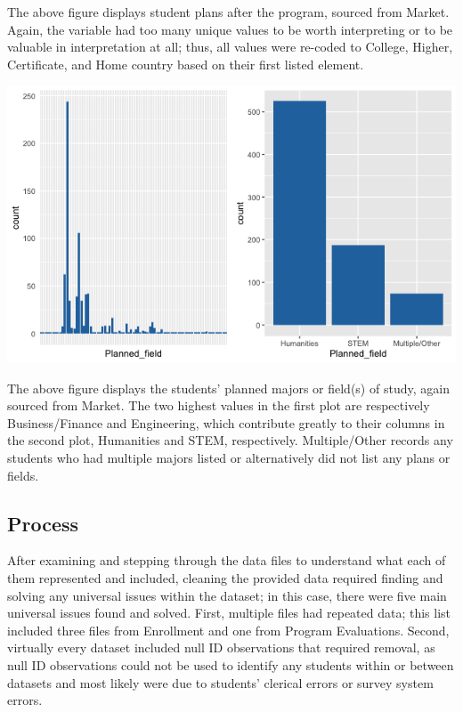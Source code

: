 \documentclass[12pt,letterpaper]{article}
\begin{document}
The above figure displays student plans after the program, sourced from Market. Again, the variable had too many unique values to be worth interpreting or to be valuable in interpretation at all; thus, all values were re-coded to College, Higher, Certificate, and Home country based on their first listed element.

\begin{center}
    \includegraphics[scale = 0.5]{Plots/schematic3.png}
\end{center}

The above figure displays the students' planned majors or field(s) of study, again sourced from Market. The two highest values in the first plot are respectively Business/Finance and Engineering, which contribute greatly to their columns in the second plot, Humanities and STEM, respectively. Multiple/Other records any students who had multiple majors listed or alternatively did not list any plans or fields.

\subsection{Process}

After examining and stepping through the data files to understand what each of them represented and included, cleaning the provided data required finding and solving any universal issues within the dataset; in this case, there were five main universal issues found and solved. First, multiple files had repeated data; this list included three files from Enrollment and one from Program Evaluations. Second, virtually every dataset included null ID observations that required removal, as null ID observations could not be used to identify any students within or between datasets and most likely were due to students’ clerical errors or survey system errors.
\end{document}
